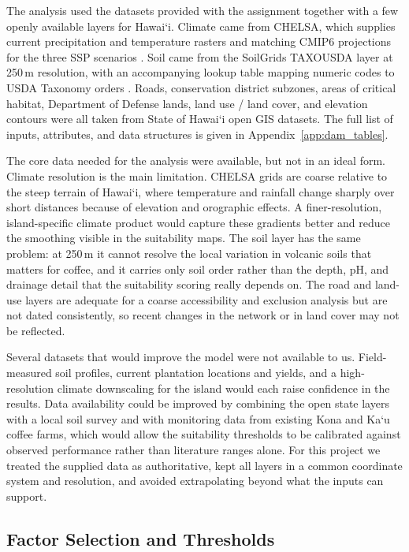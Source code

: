 \documentclass[12pt,a4paper]{article}
\newcommand{\okina}{\textquoteleft}
\begin{document}
The analysis used the datasets provided with the assignment together with a few openly available layers for Hawai\okina i. Climate came from CHELSA, which supplies current precipitation and temperature rasters and matching CMIP6 projections for the three SSP scenarios \citep{CHELSA}. Soil came from the SoilGrids TAXOUSDA layer at 250\,m resolution, with an accompanying lookup table mapping numeric codes to USDA Taxonomy orders \citep{Hengl2017}. Roads, conservation district subzones, areas of critical habitat, Department of Defense lands, land use / land cover, and elevation contours were all taken from State of Hawai\okina i open GIS datasets. The full list of inputs, attributes, and data structures is given in Appendix~\ref{app:dam_tables}.

The core data needed for the analysis were available, but not in an ideal form. Climate resolution is the main limitation. CHELSA grids are coarse relative to the steep terrain of Hawai\okina i, where temperature and rainfall change sharply over short distances because of elevation and orographic effects. A finer-resolution, island-specific climate product would capture these gradients better and reduce the smoothing visible in the suitability maps. The soil layer has the same problem: at 250\,m it cannot resolve the local variation in volcanic soils that matters for coffee, and it carries only soil order rather than the depth, pH, and drainage detail that the suitability scoring really depends on. The road and land-use layers are adequate for a coarse accessibility and exclusion analysis but are not dated consistently, so recent changes in the network or in land cover may not be reflected.

Several datasets that would improve the model were not available to us. Field-measured soil profiles, current plantation locations and yields, and a high-resolution climate downscaling for the island would each raise confidence in the results. Data availability could be improved by combining the open state layers with a local soil survey and with monitoring data from existing Kona and Ka\okina u coffee farms, which would allow the suitability thresholds to be calibrated against observed performance rather than literature ranges alone. For this project we treated the supplied data as authoritative, kept all layers in a common coordinate system and resolution, and avoided extrapolating beyond what the inputs can support.

\subsection{Factor Selection and Thresholds}
\label{sec:criteria}
\end{document}
